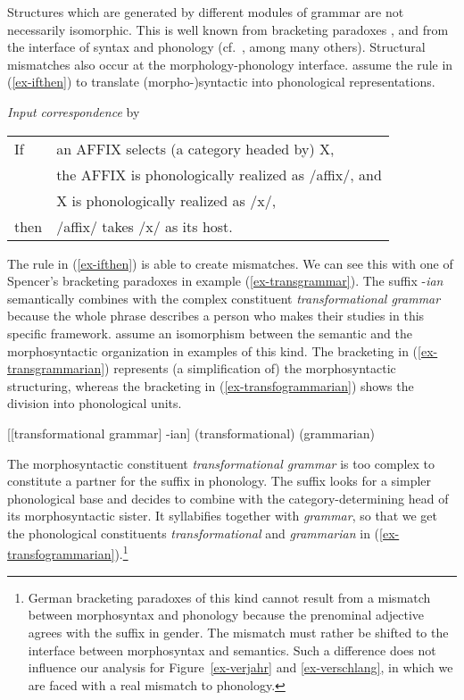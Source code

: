 \documentclass[output=paper
  ,nobabel
  ,draftmode
  ,colorlinks, citecolor=brown
]{langscibook}
\begin{document}
Structures which are generated by different modules of grammar are not necessarily isomorphic. This is well known from bracketing paradoxes \citep[cf.\ e.g.][]{Spencer1988}, and from the interface of syntax and phonology (cf.\ \cite{Shattuck-HufnagelTurk1996}, among many others). Structural mismatches also occur at the morphology-phonology interface. \citet{AckemaNeeleman2007} assume the rule in (\ref{ex-ifthen}) to translate (morpho-)syntactic into phonological representations.

\ea\emph{Input correspondence} by \citet[344]{AckemaNeeleman2007}\label{ex-ifthen}
\begin{tabular}{@{}ll}
	If &an AFFIX selects (a category headed by) X,\\
	& the AFFIX is phonologically realized as /affix/, and\\
	& X is phonologically realized as /x/,\\
	then & /affix/ takes /x/ as its host.	
\end{tabular}
\z

\begin{sloppypar}
\noindent 
The rule in (\ref{ex-ifthen}) is able to create mismatches. We can see this with one of Spencer's bracketing paradoxes in example (\ref{ex-transgrammar}). The suffix -\emph{ian} semantically combines with the complex constituent \emph{transformational grammar} because the whole phrase describes a person who makes their studies in this specific framework. \citet{AckemaNeeleman2007} assume an isomorphism between the semantic and the morphosyntactic organization in examples of this kind. The bracketing in (\ref{ex-transgrammarian}) represents (a simplification of) the morphosyntactic structuring, whereas the bracketing in (\ref{ex-transfogrammarian}) shows the division into phonological units.
\end{sloppypar}

\eal\label{ex-transgrammar}
\ex\label{ex-transgrammarian}
{[[transformational grammar] -ian]}
\ex\label{ex-transfogrammarian}
(transformational) (grammarian)
\zl

\noindent The morphosyntactic constituent \emph{transformational grammar} is too complex to constitute a partner for the suffix in phonology. The suffix looks for a simpler phonological base and decides to combine with the category-determining head of its morphosyntactic sister. It syllabifies together with \emph{grammar}, so that we get the phonological constituents \emph{transformational} and \emph{grammarian} in (\ref{ex-transfogrammarian}).\footnote{German bracketing paradoxes of this kind cannot result from a mismatch between morphosyntax and phonology because the prenominal adjective agrees with the suffix in gender. The mismatch must rather be shifted to the interface between morphosyntax and semantics. Such a difference does not influence our analysis for Figure~\ref{ex-verjahr} and \ref{ex-verschlang}, in which we are faced with a real mismatch to phonology.}
\end{document}
